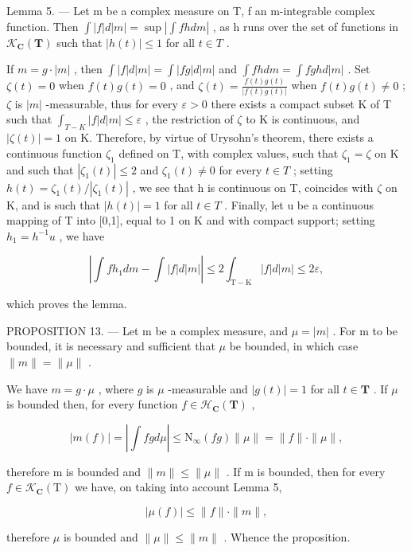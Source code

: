 Lemma 5. --- Let m be a complex measure on T, f an m-integrable complex function. Then \(\int |f| d|m| = \sup \left| \int f h dm \right|\) , as h runs over the set of functions in \(\mathcal{K}_{\mathbf{C}}(\mathbf{T})\) such that \(|h(t)| \leqslant 1\) for all \(t \in T\) .

If \(m = g \cdot |m|\) , then \(\int |f| d|m| = \int |fg| d|m|\) and \(\int f h dm = \int f gh d|m|\) . Set \(\zeta(t) = 0\) when \(f(t)g(t) = 0\) , and \(\zeta(t) = \frac{f(t)g(t)}{|f(t)g(t)|}\) when \(f(t)g(t) \neq 0\) ; \(\zeta\) is \(|m|\) -measurable, thus for every \(\varepsilon > 0\) there exists a compact subset K of T such that \(\int_{T-K} |f| d|m| \leqslant \varepsilon\) , the restriction of \(\zeta\) to K is continuous, and \(|\zeta(t)| = 1\) on K. Therefore, by virtue of Urysohn's theorem, there exists a continuous function \(\zeta_1\) defined on T, with complex values, such that \(\zeta_1 = \zeta\) on K and such that \(|\zeta_1(t)| \leqslant 2\) and \(\zeta_1(t) \neq 0\) for every \(t \in T\) ; setting \(h(t) = \zeta_1(t)/|\zeta_1(t)|\) , we see that h is continuous on T, coincides with \(\zeta\) on K, and is such that \(|h(t)| = 1\) for all \(t \in T\) . Finally, let u be a continuous mapping of T into {[}0,1{]}, equal to 1 on K and with compact support; setting \(h_1 = h^{-1}u\) , we have

\[
\left| \int f h _ {1} d m - \int | f | d | m | \right| \leqslant 2 \int_ {\mathrm{T-K}} | f | d | m | \leqslant 2 \varepsilon ,
\]

which proves the lemma.

PROPOSITION 13. --- Let m be a complex measure, and \(\mu = |m|\) . For m to be bounded, it is necessary and sufficient that \(\mu\) be bounded, in which case \(\|m\| = \|\mu\|\) .

We have \(m = g \cdot \mu\) , where \(g\) is \(\mu\) -measurable and \(|g(t)| = 1\) for all \(t \in \mathbf{T}\) . If \(\mu\) is bounded then, for every function \(f \in \mathcal{H}_{\mathbf{C}}(\mathbf{T})\) ,

\[
| m (f) | = \left| \int f g d \mu \right| \leqslant \mathrm{N} _ {\infty} (f g) \| \mu \| = \| f \| \cdot \| \mu \|,
\]

therefore m is bounded and \(\|m\|\leqslant\|\mu\|\) . If m is bounded, then for every \(f\in\mathcal{K}_{\mathbf{C}}(\mathrm{T})\) we have, on taking into account Lemma 5,

\[
| \mu (f) | \leqslant \| f \| \cdot \| m \|,
\]

therefore \(\mu\) is bounded and \(\| \mu \| \leqslant \| m\|\) . Whence the proposition.

